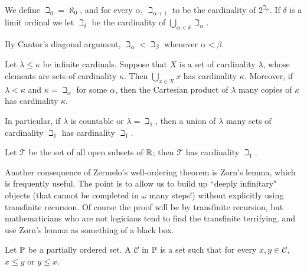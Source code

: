 \begin{definition}
\label{beth dfn}
We define $\beth_0 = \aleph_0$, and for every $\alpha$, $\beth_{\alpha + 1}$ to be the cardinality of $2^{\beth_\alpha}$.
If $\delta$ is a limit ordinal we let $\beth_\delta$ be the cardinality of $\bigcup_{\alpha < \delta} \beth_\alpha$.
\end{definition}

\begin{subsec}
By Cantor's diagonal argument, $\beth_\alpha < \beth_\beta$ whenever $\alpha < \beta$.
\end{subsec}

\begin{theorem}
\label{cardinal arithmetic trivial}
Let $\lambda \leq \kappa$ be infinite cardinals.
Suppose that $X$ is a set of cardinality $\lambda$, whose elements are sets of cardinality $\kappa$. Then $\bigcup_{x \in X} x$ has cardinality $\kappa$.
Moreover, if $\lambda < \kappa$ and $\kappa = \beth_\alpha$ for some $\alpha$, then the Cartesian product of $\lambda$ many copies of $\kappa$ has cardinality $\kappa$.
\end{theorem}

\begin{subsec}
In particular, if $\lambda$ is countable or $\lambda = \beth_1$, then a union of $\lambda$ many sets of cardinality $\beth_1$ has cardinality $\beth_1$.
\end{subsec}

\begin{theorem}
\label{cardinality of topology}
Let $\mathcal T$ be the set of all open subsets of $\mathbb{R}$; then $\mathcal T$ has cardinality $\beth_1$.
\end{theorem}

\begin{subsec}
Another consequence of Zermelo's well-ordering theorem is Zorn's lemma, which is frequently useful.
The point is to allow us to build up ``deeply infinitary" objects (that cannot be completed in $\omega$ many steps!) without explicitly using transfinite recursion.
Of course the proof will be by transfinite recursion, but mathematicians who are not logicians tend to find the transfinite terrifying, and use Zorn's lemma as something of a black box.
\end{subsec}

\begin{definition}
Let $\mathbb{P}$ be a partially ordered set. A  $\mathcal C$ in $\mathbb{P}$ is a set such that for every $x, y \in \mathcal C$, $x \leq y$ or $y \leq x$.
\end{definition}


